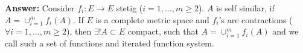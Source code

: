 \documentclass[11pt]{article}
\begin{document}
\begin{enumerate}
    \textbf{Answer:} Consider $f_i \colon E \to E$ stetig ($i = 1,\dots,m \ge 2$). $A$ is self similar, if $A = \cup_{i=1}^m f_i(A)$. If $E$ is a complete metric space and $f_i$'s are contractions ($\forall i = 1,\dots,m \ge 2$), then $\exists ! A \subset E$ compact, such that $A = \cup_{i=1}^m f_i(A)$ and we call such a set of functions and iterated function system.
\end{enumerate}
\end{document}
